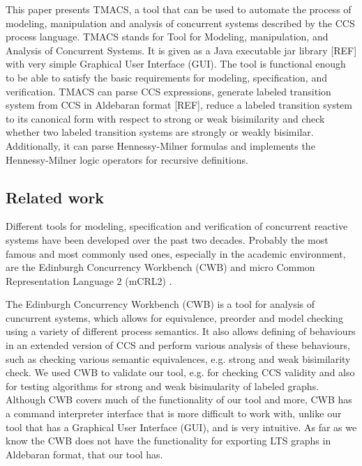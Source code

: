 This paper presents TMACS, a tool that can be used to automate the process of modeling, manipulation and analysis of concurrent systems described by the CCS process language. TMACS stands for Tool for Modeling, manipulation, and Analysis of Concurrent Systems. It is given as a Java executable jar library [REF] with very simple Graphical User Interface (GUI). The tool is functional enough to be able to satisfy the basic requirements for modeling, specification, and verification. TMACS can parse CCS expressions, generate labeled transition system from CCS in Aldebaran format [REF], reduce a labeled transition system to its canonical form with respect to strong or weak bisimilarity and check whether two labeled transition systems are strongly or weakly bisimilar. Additionally, it can parse Hennessy-Milner formulas and implements the Hennessy-Milner logic operators for recursive definitions.

\subsection{Related work} 

Different tools for modeling, specification and verification of concurrent reactive systems have been developed over the past two decades. Probably the most famous and most commonly used ones, especially in the academic environment, are the Edinburgh Concurrency Workbench (CWB) \cite{CWB} and micro Common Representation Language 2 (mCRL2) \cite{mCRL2}. 

The Edinburgh Concurrency Workbench (CWB) is a tool for analysis of cuncurrent systems, which allows for equivalence, preorder and model checking using a variety of different process semantics. It also allows defining of behaviours in an extended version of CCS and perform various analysis of these behaviours, such as checking various semantic equivalences, e.g. strong and weak bisimilarity check. We used CWB to validate our tool, e.g. for checking CCS validity and also for testing algorithms for strong and weak bisimularity of labeled graphs. Although CWB covers much of the functionality of our tool and more, CWB has a command interpreter interface that is more difficult to work with, unlike our tool that has a Graphical User Interface (GUI), and is very intuitive. As far as we know the CWB does not have the functionality for exporting LTS graphs in Aldebaran format, that our tool has. 

